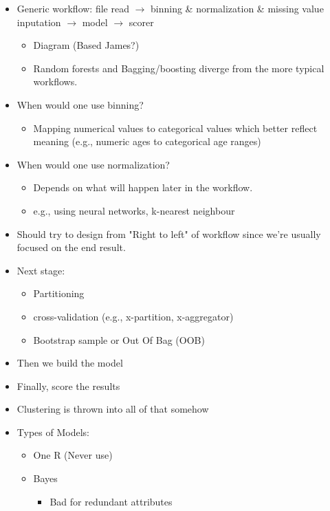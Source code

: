 \begin{itemize}
  \item Generic workflow: file read \(\rightarrow\) binning \& normalization \& missing value inputation \(\rightarrow\) model \(\rightarrow\) scorer \begin{itemize}
          \item Diagram (Based James?)
          \item Random forests and Bagging/boosting diverge from the more typical workflows.
        \end{itemize}
  \item When would one use binning? \begin{itemize}
          \item Mapping numerical values to categorical values which better reflect meaning (e.g., numeric ages to categorical age ranges)
        \end{itemize}
  \item When would one use normalization? \begin{itemize}
          \item Depends on what will happen later in the workflow.
          \item e.g., using neural networks, k-nearest neighbour
        \end{itemize}
  \item Should try to design from "Right to left" of workflow since we're usually focused on the end result.
  \item Next stage: \begin{itemize}
          \item Partitioning
          \item cross-validation (e.g., x-partition, x-aggregator)
          \item Bootstrap sample or Out Of Bag (OOB)
        \end{itemize}
  \item Then we build the model
  \item Finally, score the results
  \item Clustering is thrown into all of that somehow
  \item Types of Models: \begin{itemize}
          \item One R (Never use)
          \item Bayes \begin{itemize}
                  \item Bad for redundant attributes

\end{itemize}
\end{itemize}
\end{itemize}
